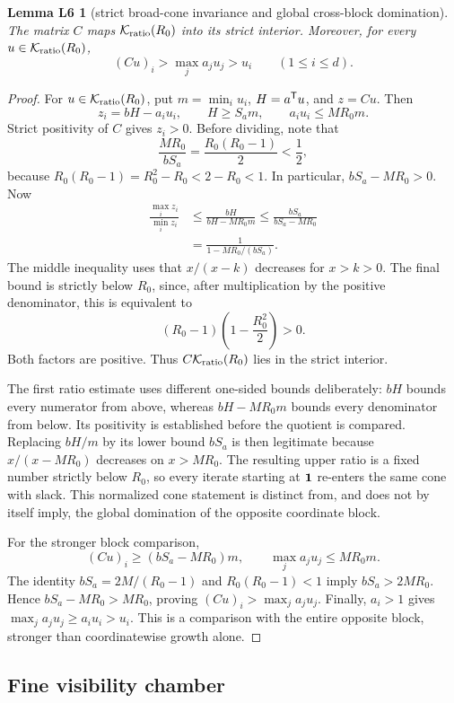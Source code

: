 \documentclass[11pt,letterpaper]{article}
\theoremstyle{plain}
\newtheorem*{lemLsix}{Lemma L6}
\begin{document}
\begin{lemLsix}[strict broad-cone invariance and global cross-block domination]
The matrix $C$ maps $\mathcal{K}_{\mathrm{ratio}}(R_0)$ into its strict interior.  Moreover, for every $u\in\mathcal{K}_{\mathrm{ratio}}(R_0)$,
\[
(Cu)_i>\max_j a_j u_j>u_i\qquad(1\leq i\leq d).
\]
\end{lemLsix}

\begin{proof}
For $u\in\mathcal{K}_{\mathrm{ratio}}(R_0)$, put $m=\min_i u_i$, $H=a^{\mathsf{T}}u$, and $z=Cu$.  Then
\[
z_i=bH-a_i u_i,\qquad H\geq S_am,\qquad a_i u_i\leq MR_0m.
\]
Strict positivity of $C$ gives $z_i>0$.  Before dividing, note that
\[
\frac{MR_0}{bS_a}=\frac{R_0(R_0-1)}{2}<\frac12,
\]
because $R_0(R_0-1)=R_0^2-R_0<2-R_0<1$.  In particular, $bS_a-MR_0>0$.  Now
\begin{align*}
\frac{\max_i z_i}{\min_i z_i}
&\leq\frac{bH}{bH-MR_0m}
\leq\frac{bS_a}{bS_a-MR_0}\\
&=\frac{1}{1-MR_0/(bS_a)}.
\end{align*}
The middle inequality uses that $x/(x-k)$ decreases for $x>k>0$.  The final bound is strictly below $R_0$, since, after multiplication by the positive denominator, this is equivalent to
\[
(R_0-1)\left(1-\frac{R_0^2}{2}\right)>0.
\]
Both factors are positive.  Thus $C\mathcal{K}_{\mathrm{ratio}}(R_0)$ lies in the strict interior.

The first ratio estimate uses different one-sided bounds deliberately: \(bH\) bounds every numerator from above, whereas \(bH-MR_0m\) bounds every denominator from below.  Its positivity is established before the quotient is compared.  Replacing \(bH/m\) by its lower bound \(bS_a\) is then legitimate because \(x/(x-MR_0)\) decreases on \(x>MR_0\).  The resulting upper ratio is a fixed number strictly below \(R_0\), so every iterate starting at \(\mathbf{1}\) re-enters the same cone with slack.  This normalized cone statement is distinct from, and does not by itself imply, the global domination of the opposite coordinate block.

For the stronger block comparison,
\[
(Cu)_i\geq(bS_a-MR_0)m,\qquad \max_j a_j u_j\leq MR_0m.
\]
The identity $bS_a=2M/(R_0-1)$ and $R_0(R_0-1)<1$ imply $bS_a>2MR_0$.  Hence $bS_a-MR_0>MR_0$, proving $(Cu)_i>\max_j a_j u_j$.  Finally, $a_i>1$ gives $\max_j a_j u_j\geq a_i u_i>u_i$.  This is a comparison with the entire opposite block, stronger than coordinatewise growth alone.
\end{proof}

\subsection{Fine visibility chamber}
\end{document}
